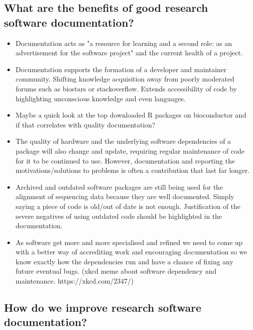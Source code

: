 \documentclass{SBCbookchapter}
\begin{document}
\subsection{What are the benefits of good research software documentation?}
\begin{itemize}
    \item Documentation acts as "a resource for learning and a second role: as an advertisement for the software project" and the current health of a project.\cite{Geiger2018}
    \item Documentation supports the formation of a developer and maintainer community. Shifting knowledge acquisition away from poorly moderated forums such as biostars or stackoverflow. Extends accessibility of code by highlighting unconscious knowledge and even languages.
    \item Maybe a quick look at the top downloaded R packages on bioconductor and if that correlates with quality documentation?
    \item The quality of hardware and the underlying software dependencies of a package will also change and update, requiring regular maintenance of code for it to be continued to use. However, documentation and reporting the motivations/solutions to problems is often a contribution that last far longer.
    \item Archived and outdated software packages are still being used for the alignment of sequencing data because they are well documented. Simply saying a piece of code is old/out of date is not enough. Justification of the severe negatives of using outdated code should be highlighted in the documentation.
    \item As software get more and more specialised and refined we need to come up with a better way of accrediting work and encouraging documentation so we know exactly how the dependencies run and have a chance of fixing any future eventual bugs. (xkcd meme about software dependency and maintenance. https://xkcd.com/2347/)
\end{itemize}

\subsection{How do we improve research software documentation?}
\end{document}
